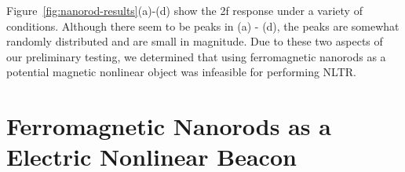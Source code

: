 Figure~\ref{fig:nanorod-results}(a)-(d) show the 2f response under a variety of conditions. Although there seem to be peaks in (a) - (d), the peaks are somewhat randomly distributed and are small in magnitude. Due to these two aspects of our preliminary testing, we determined that using ferromagnetic nanorods as a potential magnetic nonlinear object was infeasible for performing NLTR. 

\chapter{Ferromagnetic Nanorods as a Electric Nonlinear Beacon}
